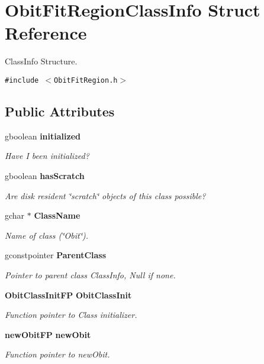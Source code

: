 \section{Obit\-Fit\-Region\-Class\-Info Struct Reference}
\label{structObitFitRegionClassInfo}
Class\-Info Structure.  


{\tt \#include $<$Obit\-Fit\-Region.h$>$}

\subsection*{Public Attributes}
\begin{CompactItemize}
\item 
gboolean {\bf initialized}
\begin{CompactList}\small\item\em Have I been initialized? \item\end{CompactList}\item 
gboolean {\bf has\-Scratch}
\begin{CompactList}\small\item\em Are disk resident \char`\"{}scratch\char`\"{} objects of this class possible? \item\end{CompactList}\item 
gchar $\ast$ {\bf Class\-Name}
\begin{CompactList}\small\item\em Name of class (\char`\"{}Obit\char`\"{}). \item\end{CompactList}\item 
gconstpointer {\bf Parent\-Class}
\begin{CompactList}\small\item\em Pointer to parent class Class\-Info, Null if none. \item\end{CompactList}\item 
{\bf Obit\-Class\-Init\-FP} {\bf Obit\-Class\-Init}
\begin{CompactList}\small\item\em Function pointer to Class initializer. \item\end{CompactList}\item 
{\bf new\-Obit\-FP} {\bf new\-Obit}
\begin{CompactList}\small\item\em Function pointer to new\-Obit. \item\end{CompactList}\item 

\end{CompactItemize}
